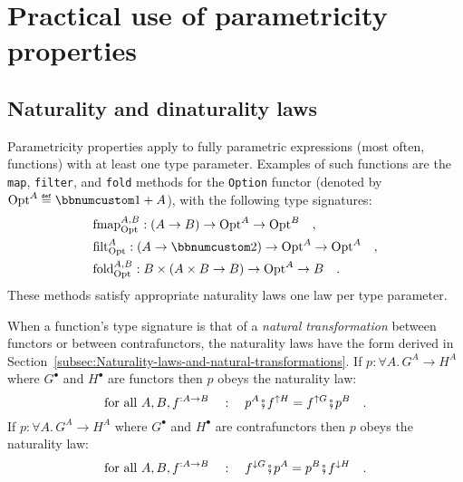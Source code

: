 \section{Practical use of parametricity properties}

\subsection{Naturality and dinaturality laws\label{sec:Naturality-laws-for-fully-parametric-functions} }

Parametricity properties apply to fully parametric expressions (most
often, functions) with at least one type parameter. Examples of such
functions are the \lstinline!map!, \lstinline!filter!, and \lstinline!fold!
methods for the \lstinline!Option! functor (denoted by $\text{Opt}^{A}\triangleq\bbnum 1+A$),
with the following type signatures:
\begin{align*}
 & \text{fmap}_{\text{Opt}}^{A,B}:\left(A\rightarrow B\right)\rightarrow\text{Opt}^{A}\rightarrow\text{Opt}^{B}\quad,\\
 & \text{filt}_{\text{Opt}}^{A}:\left(A\rightarrow\bbnum 2\right)\rightarrow\text{Opt}^{A}\rightarrow\text{Opt}^{A}\quad,\\
 & \text{fold}_{\text{Opt}}^{A,B}:B\times\left(A\times B\rightarrow B\right)\rightarrow\text{Opt}^{A}\rightarrow B\quad.
\end{align*}
These methods satisfy appropriate naturality laws \textemdash{} one
law per type parameter. 

When a function\textsf{'}s type signature is that of a \emph{natural transformation}
between functors or between contrafunctors, the naturality laws have
the form derived in Section~\ref{subsec:Naturality-laws-and-natural-transformations}.
If $p:\forall A.\,G^{A}\rightarrow H^{A}$ where $G^{\bullet}$ and
$H^{\bullet}$ are functors then $p$ obeys the naturality law:
\begin{equation}
\text{for all }A,B,f^{:A\rightarrow B}\quad:\quad p^{A}\bef f^{\uparrow H}=f^{\uparrow G}\bef p^{B}\quad.\label{eq:naturality-law-for-functors}
\end{equation}
If $p:\forall A.\,G^{A}\rightarrow H^{A}$ where $G^{\bullet}$ and
$H^{\bullet}$ are contrafunctors then $p$ obeys the naturality law:
\begin{equation}
\text{for all }A,B,f^{:A\rightarrow B}\quad:\quad f^{\downarrow G}\bef p^{A}=p^{B}\bef f^{\downarrow H}\quad.\label{eq:naturality-law-for-contrafunctors}
\end{equation}

